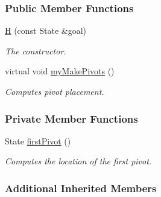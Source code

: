 \subsubsection*{Public Member Functions}
\begin{DoxyCompactItemize}
\item 
\hyperlink{structslb_1_1ext_1_1heuristic_1_1differential_1_1H_3_01State_00_01BaseHeuristic_00_01Furthest_0071671274a92eae86902a47a514057667_a719b3510be70cd0c8d6d1f562973db12}{H} (const State \&goal)
\begin{DoxyCompactList}\small\item\em The constructor. \end{DoxyCompactList}\item 
virtual void \hyperlink{structslb_1_1ext_1_1heuristic_1_1differential_1_1H_3_01State_00_01BaseHeuristic_00_01Furthest_0071671274a92eae86902a47a514057667_af63742c56f7bc521f323db6881477713}{my\+Make\+Pivots} ()\hypertarget{structslb_1_1ext_1_1heuristic_1_1differential_1_1H_3_01State_00_01BaseHeuristic_00_01Furthest_0071671274a92eae86902a47a514057667_af63742c56f7bc521f323db6881477713}{}\label{structslb_1_1ext_1_1heuristic_1_1differential_1_1H_3_01State_00_01BaseHeuristic_00_01Furthest_0071671274a92eae86902a47a514057667_af63742c56f7bc521f323db6881477713}

\begin{DoxyCompactList}\small\item\em Computes pivot placement. \end{DoxyCompactList}\end{DoxyCompactItemize}
\subsubsection*{Private Member Functions}
\begin{DoxyCompactItemize}
\item 
State \hyperlink{structslb_1_1ext_1_1heuristic_1_1differential_1_1H_3_01State_00_01BaseHeuristic_00_01Furthest_0071671274a92eae86902a47a514057667_a6ad762f8a4b0180df31211adb80747c6}{first\+Pivot} ()
\begin{DoxyCompactList}\small\item\em Computes the location of the first pivot. \end{DoxyCompactList}\end{DoxyCompactItemize}
\subsubsection*{Additional Inherited Members}


